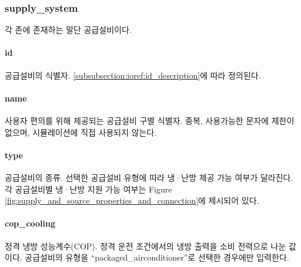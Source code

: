 \subsubsection{supply\_system} \label{subsubsection:ioref:supplysystem}
각 존에 존재하는 말단 공급설비이다. 


\paragraph{id} 공급설비의 식별자. \ref{subsubsection:ioref:id_description}에 따라 정의된다.

\paragraph{name} 사용자 편의를 위해 제공되는 공급설비 구별 식별자. 중복, 사용가능한 문자에 제한이 없으며, 시뮬레이션에 직접 사용되지 않는다.

\paragraph{type} 공급설비의 종류. 선택한 공급설비 유형에 따라 냉·난방 제공 가능 여부가 달라진다. 각 공급설비별 냉·난방 지원 가능 여부는 Figure \ref{fig:supply_and_source_properties_and_connection}에 제시되어 있다.

\paragraph{cop\_cooling} 정격 냉방 성능계수(COP). 정격 운전 조건에서의 냉방 출력을 소비 전력으로 나눈 값이다. 공급설비의 유형을 ``packaged\_airconditioner''로 선택한 경우에만 입력한다.

